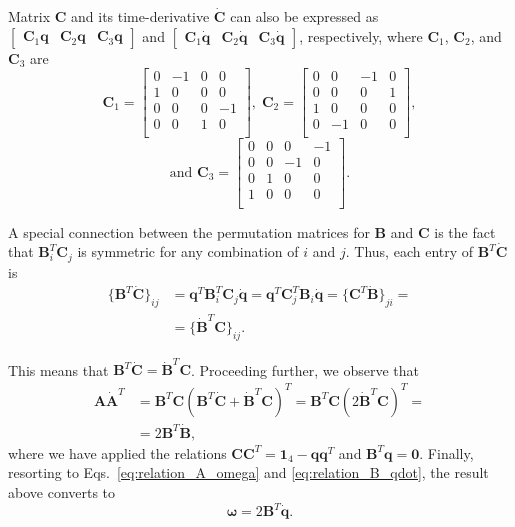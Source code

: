 \documentclass[aip,jcp,reprint,amsmath,amssymb]{revtex4-1}
\newcommand{\mt}[1]{\boldsymbol{\mathbf{#1}}}           %
\newcommand{\vt}[1]{\boldsymbol{\mathbf{#1}}}           %
\newcommand{\tr}[1]{#1^T}                               %
\begin{document}
Matrix $\mt C$ and its time-derivative $\dot{\mt C}$ can also be expressed as $[\begin{array}{ccc}{\mt C}_1{\vt q} & {\mt C}_2{\vt q} & {\mt C}_3{\vt q}\end{array}]$ and $[\begin{array}{ccc}{\mt C}_1\dot{\vt q} & {\mt C}_2\dot{\vt q} & {\mt C}_3\dot{\vt q}\end{array}]$, respectively, where $\mt C_1$, $\mt C_2$, and $\mt C_3$ are
\[
{\mt C}_1 = \left[ \begin{array}{rrrr}
 0 & -1 &  0 &  0 \\
 1 &  0 &  0 &  0 \\
 0 &  0 &  0 & -1 \\
 0 &  0 &  1 &  0 \\
\end{array} \right], \;
{\mt C}_2 = \left[ \begin{array}{rrrr}
 0 &  0 & -1 &  0 \\
 0 &  0 &  0 &  1 \\
 1 &  0 &  0 &  0 \\
 0 & -1 &  0 &  0 \\
\end{array} \right],
\]\[
\text{and }{\mt C}_3 = \left[ \begin{array}{rrrr}
 0 &  0 &  0 & -1 \\
 0 &  0 & -1 &  0 \\
 0 &  1 &  0 &  0 \\
 1 &  0 &  0 &  0 \\
\end{array} \right].
\]

A special connection between the permutation matrices for $\mt B$ and $\mt C$ is the fact that $\tr{\mt B_i}{\mt C_j}$ is symmetric for any combination of $i$ and $j$. Thus, each entry of $\tr{\mt B}\dot{\mt C}$ is
\begin{align*}
\{\tr{\mt B}\dot{\mt C}\}_{ij} &= \tr{\vt q}\tr{\mt B}_i{\mt C}_j\dot{\vt q} = \tr{\vt q}\tr{\mt C}_j{\mt B}_i\dot{\vt q} = \{\tr{\mt C}\dot{\mt B}\}_{ji} = \\
&= \{\tr{\dot{\mt B}}\mt C\}_{ij}.
\end{align*}

This means that $\tr{\mt B}\dot{\mt C} = \tr{\dot{\mt B}}{\mt C}$. Proceeding further, we observe that
\begin{align*}
\mt A \tr{\dot{\mt A}} &= \tr{\mt B}\mt C \tr{(\tr{{\mt B}}\dot{\mt C} + \tr{\dot{\mt B}}{\mt C})} = \tr{\mt B}\mt C \tr{(2 \tr{\dot{\mt B}}{\mt C})} = \\
&= 2 \tr{\mt B}\dot{\mt B},
\end{align*}
where we have applied the relations $\mt C \tr{\mt C} = \mt 1_4 - \vt q\tr{\vt q}$ and $\tr{\vt B}\vt q = \vt 0$. Finally, resorting to Eqs.~\ref{eq:relation_A_omega} and \ref{eq:relation_B_qdot}, the result above converts to
\begin{equation}
\vt \omega = 2\tr{\mt B}\dot{\vt q}.
\end{equation}
\end{document}
